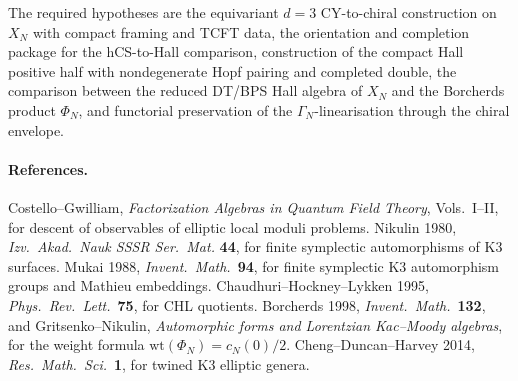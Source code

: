 \documentclass[11pt]{amsart}
\theoremstyle{plain}
\theoremstyle{definition}
\theoremstyle{remark}
\begin{document}
The required hypotheses are the equivariant $d=3$ CY-to-chiral
construction on $X_N$ with compact framing and TCFT data, the orientation
and completion package for the hCS-to-Hall comparison, construction of
the compact Hall positive half with nondegenerate Hopf pairing and
completed double, the comparison between the reduced DT/BPS Hall algebra
of $X_N$ and the Borcherds product $\Phi_N$, and functorial preservation
of the $\Gamma_N$-linearisation through the chiral envelope.

\paragraph{References.}
Costello--Gwilliam, \emph{Factorization Algebras in Quantum Field
Theory}, Vols.~I--II, for descent of observables of elliptic local
moduli problems. Nikulin 1980, \emph{Izv.\ Akad.\ Nauk SSSR Ser.\ Mat.}
\textbf{44}, for finite symplectic automorphisms of K3 surfaces. Mukai
1988, \emph{Invent.\ Math.}~\textbf{94}, for finite symplectic K3
automorphism groups and Mathieu embeddings. Chaudhuri--Hockney--Lykken
1995, \emph{Phys.\ Rev.\ Lett.}~\textbf{75}, for CHL quotients.
Borcherds 1998, \emph{Invent.\ Math.}~\textbf{132}, and
Gritsenko--Nikulin, \emph{Automorphic forms and Lorentzian
Kac--Moody algebras}, for the weight formula
$\mathrm{wt}(\Phi_N)=c_N(0)/2$. Cheng--Duncan--Harvey 2014,
\emph{Res.\ Math.\ Sci.}~\textbf{1}, for twined K3 elliptic genera.
\end{document}
